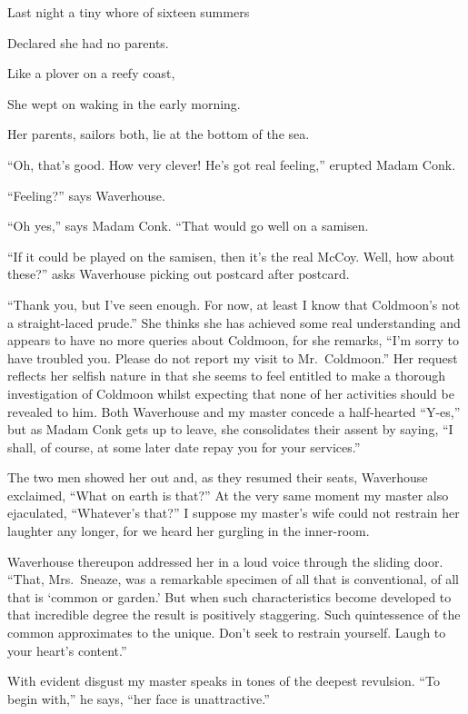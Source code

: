 \documentclass[12pt, openright]{book}
\begin{document}
Last night a tiny whore of sixteen summers

Declared she had no parents.

Like a plover on a reefy coast,

She wept on waking in the early morning.

Her parents, sailors both, lie at the bottom of the sea.

``Oh, that's good. How very clever! He's got real feeling,'' erupted
Madam Conk.

``Feeling?'' says Waverhouse.

``Oh yes,'' says Madam Conk. ``That would go well on a samisen.

``If it could be played on the samisen, then it's the real McCoy. Well,
how about these?'' asks Waverhouse picking out postcard after postcard.

``Thank you, but I've seen enough. For now, at least I know that
Coldmoon's not a straight-laced prude.'' She thinks she has achieved
some real understanding and appears to have no more queries about
Coldmoon, for she remarks, ``I'm sorry to have troubled you. Please do
not report my visit to Mr.~Coldmoon.'' Her request reflects her selfish
nature in that she seems to feel entitled to make a thorough
investigation of Coldmoon whilst expecting that none of her activities
should be revealed to him. Both Waverhouse and my master concede a
half-hearted ``Y-es,'' but as Madam Conk gets up to leave, she
consolidates their assent by saying, ``I shall, of course, at some later
date repay you for your services.''

The two men showed her out and, as they resumed their seats, Waverhouse
exclaimed, ``What on earth is that?'' At the very same moment my master
also ejaculated, ``Whatever's that?'' I suppose my master's wife could
not restrain her laughter any longer, for we heard her gurgling in the
inner-room.

Waverhouse thereupon addressed her in a loud voice through the sliding
door. ``That, Mrs.~Sneaze, was a remarkable specimen of all that is
conventional, of all that is `common or garden.' But when such
characteristics become developed to that incredible degree the result is
positively staggering. Such quintessence of the common approximates to
the unique. Don't seek to restrain yourself. Laugh to your heart's
content.''

With evident disgust my master speaks in tones of the deepest revulsion.
``To begin with,'' he says, ``her face is unattractive.''
\end{document}
